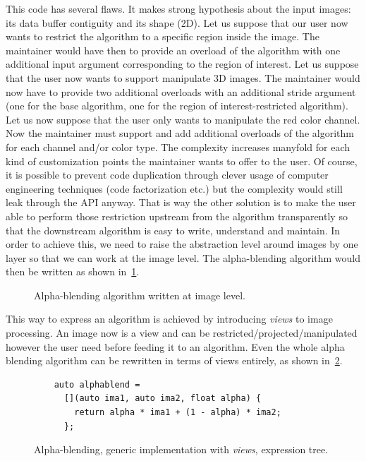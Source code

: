 This code has several flaws. It makes strong hypothesis about the input images: its data buffer contiguity and its shape
(2D). Let us suppose that our user now wants to restrict the algorithm to a specific region inside the image. The
maintainer would have then to provide an overload of the algorithm with one additional input argument corresponding to
the region of interest. Let us suppose that the user now wants to support manipulate 3D images. The maintainer would now
have to provide two additional overloads with an additional stride argument (one for the base algorithm, one for the
region of interest-restricted algorithm). Let us now suppose that the user only wants to manipulate the red color
channel. Now the maintainer must support and add additional overloads of the algorithm for each channel and/or color
type. The complexity increases manyfold for each kind of customization points the maintainer wants to offer to the user.
Of course, it is possible to prevent code duplication through clever usage of computer engineering techniques (code
factorization etc.) but the complexity would still leak through the API anyway. That is way the other solution is to
make the user able to perform those restriction upstream from the algorithm transparently so that the downstream
algorithm is easy to write, understand and maintain. In order to achieve this, we need to raise the abstraction level
around images by one layer so that we can work at the image level. The alpha-blending algorithm would then be written as
shown in~\cref{summary:fig:view.alphablend}.

\begin{figure}[htbp]
  \centering
  

  \caption[]{Alpha-blending algorithm written at image level.}
  \label{summary:fig:view.alphablend}
\end{figure}

This way to express an algorithm is achieved by introducing \emph{views} to image processing. An image now is a view and
can be restricted/projected/manipulated however the user need before feeding it to an algorithm. Even the whole alpha
blending algorithm can be rewritten in terms of views entirely, as shown in~\cref{summary:fig:new.alphablend}.

\begin{figure}[htbp]
  \centering
  \begin{minipage}[b]{5.5cm}
    
  \end{minipage}
  \begin{minipage}[b]{5.5cm}
    \begin{verbatim}
    auto alphablend =
      [](auto ima1, auto ima2, float alpha) {
        return alpha * ima1 + (1 - alpha) * ima2;
      };
    \end{verbatim}
    \bigskip
    \bigskip
    \bigskip
  \end{minipage}
  \caption[]{Alpha-blending, generic implementation with \emph{views}, expression tree.}
  \label{summary:fig:new.alphablend}
\end{figure}


